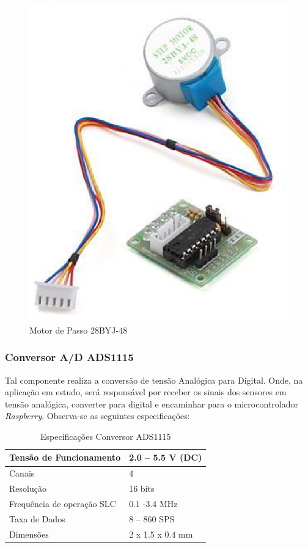 \begin{figure}[h]
	\centering
	\includegraphics[keepaspectratio=true,scale=0.4]{figuras/sensor2.eps}
	\caption{Motor de Passo 28BYJ-48}
	\label{sensor2}
\end{figure}

\subsubsection{Conversor A/D ADS1115}

Tal componente realiza a conversão de tensão Analógica para Digital. Onde, na aplicação em estudo, será responsável por receber os sinais dos sensores em tensão analógica, converter para digital e encaminhar para o microcontrolador \textit{Raspberry}. Observa-se as seguintes especificações:

\begin{table}[h]
\centering
\caption{Especificações Conversor ADS1115}
\label{table4}
\begin{tabular}{|l|l|}
\hline
Tensão de Funcionamento    & 2.0 – 5.5 V (DC) \\ \hline
Canais                     & 4                \\ \hline
Resolução                  & 16 bits          \\ \hline
Frequência de operação SLC & 0.1 -3.4 MHz     \\ \hline
Taxa de Dados              & 8 – 860 SPS      \\ \hline
Dimensões                  & 2 x 1.5 x 0.4 mm \\ \hline
\end{tabular}
\end{table}

